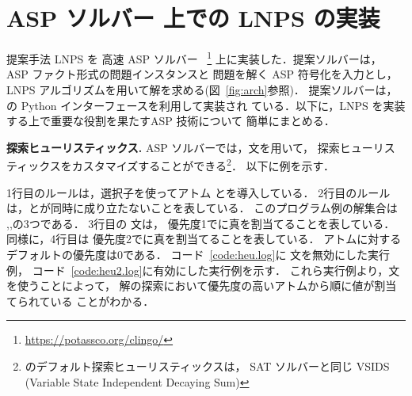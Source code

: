 \section{ASP ソルバー 上での LNPS の実装}
%
提案手法 LNPS を 高速 ASP ソルバー
{\clingo}~\footnote{\url{https://potassco.org/clingo/}}
上に実装した．提案ソルバーは，
ASP ファクト形式の問題インスタンスと
問題を解く ASP 符号化を入力とし，
LNPS アルゴリズムを用いて解を求める(図~\ref{fig:arch}参照)．
%
提案ソルバーは，{\clingo}の Python インターフェースを利用して実装され
ている．以下に，LNPS を実装する上で重要な役割を果たすASP 技術について
簡単にまとめる．

\textbf{探索ヒューリスティックス.}
ASP ソルバー{\clingo}では，文を用いて，
探索ヒューリスティックスをカスタマイズすることができる\footnote{%
{\clingo}のデフォルト探索ヒューリスティックスは，
SAT ソルバーと同じ VSIDS (Variable State Independent Decaying Sum)}．
以下に例を示す．





1行目のルールは，選択子を使ってアトム
とを導入している．
2行目のルールは，とが同時に成り立たないことを表している．
このプログラム例の解集合は
\code{\{\}},,の3つである．
3行目の 文は，
優先度1でに真を割当てることを表している．
同様に，4行目は
優先度2でに真を割当てることを表している．
アトムに対するデフォルトの優先度は0である．
%
コード~\ref{code:heu.log}に 文を無効にした実行例，
コード~\ref{code:heu2.log}に有効にした実行例を示す．
これら実行例より，文を使うことによって，
解の探索において優先度の高いアトムから順に値が割当てられている
ことがわかる．


